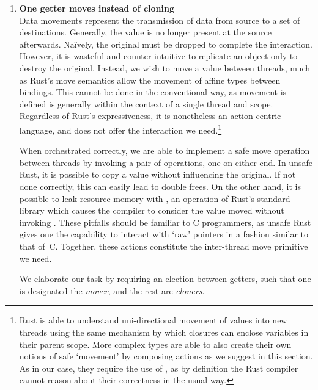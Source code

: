 \begin{enumerate}
	\item \textbf{One getter moves instead of cloning}\\
	Data movements represent the transmission of data from source to a set of destinations. Generally, the value is no longer present at the source afterwards. Na\"ively, the original must be dropped to complete the interaction. However, it is wasteful and counter-intuitive to replicate an object only to destroy the original. Instead, we wish to move a value between threads, much as Rust's move semantics allow the movement of affine types between bindings. This cannot be done in the conventional way, as movement is defined is generally within the context of a single thread and scope. Regardless of Rust's expressiveness, it is nonetheless an action-centric language, and does not offer the interaction we need.\footnote{Rust is able to understand uni-directional movement of values into new threads using the same mechanism by which closures can enclose variables in their parent scope. More complex types are able to also create their own notions of safe `movement' by composing actions as we suggest in this section. As in our case, they require the use of , as by definition the Rust compiler cannot reason about their correctness in the usual way.} 
	
	When orchestrated correctly, we are able to implement a safe move operation between threads by invoking a pair of  operations, one on either end. In unsafe Rust, it is possible to copy a value without influencing the original. If not done correctly, this can easily lead to double frees. On the other hand, it is possible to leak resource memory with , an operation of Rust's standard library which causes the compiler to consider the value moved without invoking . These pitfalls should be familiar to C programmers, as unsafe Rust gives one the capability to interact with `raw' pointers in a fashion similar to that of~C. Together, these actions constitute the inter-thread move primitive we need.
	
	We elaborate our task by requiring an election between getters, such that one is designated the \textit{mover}, and the rest are \textit{cloners}. 
	

\end{enumerate}
